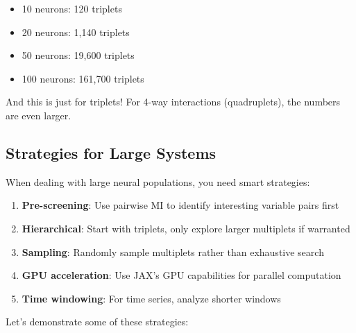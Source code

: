 \documentclass[
  11pt,
  letterpaper,
  oneside,
  openany]{book}
\providecommand{\tightlist}{%
  \setlength{\itemsep}{0pt}\setlength{\parskip}{0pt}}
\begin{document}
\begin{itemize}
\tightlist
\item
  10 neurons: 120 triplets
\item
  20 neurons: 1,140 triplets
\item
  50 neurons: 19,600 triplets
\item
  100 neurons: 161,700 triplets
\end{itemize}

And this is just for triplets! For 4-way interactions (quadruplets), the
numbers are even larger.

\subsection{Strategies for Large
Systems}\label{strategies-for-large-systems}

When dealing with large neural populations, you need smart strategies:

\begin{enumerate}
\def\labelenumi{\arabic{enumi}.}
\tightlist
\item
  \textbf{Pre-screening}: Use pairwise MI to identify interesting
  variable pairs first
\item
  \textbf{Hierarchical}: Start with triplets, only explore larger
  multiplets if warranted
\item
  \textbf{Sampling}: Randomly sample multiplets rather than exhaustive
  search
\item
  \textbf{GPU acceleration}: Use JAX's GPU capabilities for parallel
  computation
\item
  \textbf{Time windowing}: For time series, analyze shorter windows
\end{enumerate}

Let's demonstrate some of these strategies:
\end{document}
